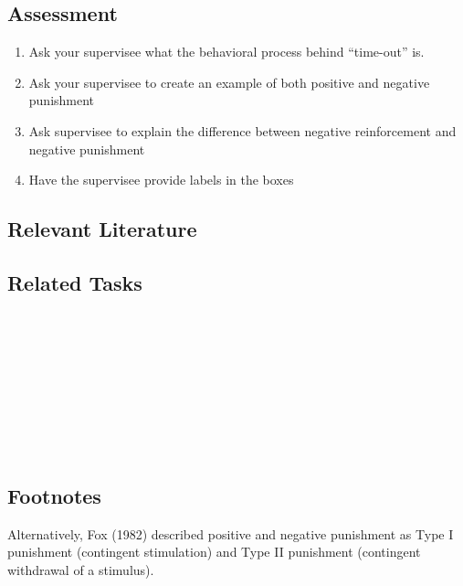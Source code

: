 \subsection{Assessment}
\begin{enumerate}
\item Ask your supervisee what the behavioral process behind ``time-out'' is. 
\item Ask your supervisee to create an example of both positive and negative punishment
\item Ask supervisee to explain the difference between negative reinforcement and negative punishment
\item Have the supervisee provide labels in the boxes
\end{enumerate}
%
\subsection{Relevant Literature}
\begin{refsection}
\nocite{test,alang2017police,clayton2018black}
\printbibliography[heading=none]
\end{refsection} 
%
\subsection{Related Tasks}
\fourdOne{}\\
\fourdSeventeen{}\\
\fourdNineteen{}\\
\foureEleven{}\\
\fourgSeven{}\\
\fourjTen{}\\
\fourFKNineteen{}\\
\fourFKTwenty{}\\
%
\subsection{Footnotes}
Alternatively, Fox (1982) described positive and negative punishment as Type I punishment (contingent stimulation) and Type II punishment (contingent withdrawal of a stimulus).

